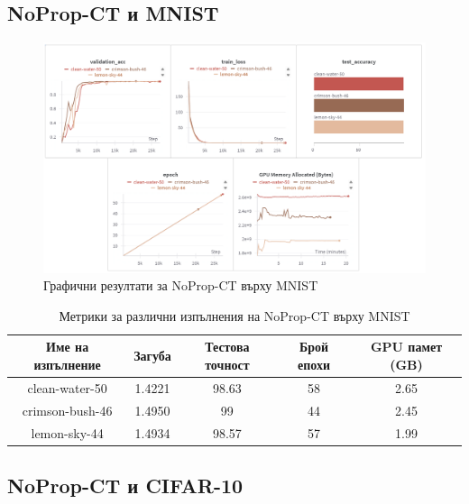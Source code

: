 \documentclass[a4paper,11pt]{article}
\begin{document}
\subsection{NoProp-CT и MNIST}

\begin{figure}[H]
    \centering
    \includegraphics[width=6.26in,keepaspectratio]{images/NoProp-CT MNIST.png}
    \caption{Графични резултати за NoProp-CT върху MNIST}
\end{figure}

\begin{table}[H]
  \centering
  \renewcommand{\arraystretch}{1.5} %
  \begin{tabular}{ccccc}
    \toprule
    \textbf{Име на изпълнение} & \textbf{Загуба} & \textbf{Тестова точност} & \textbf{Брой епохи} & \textbf{GPU памет (GB)}\\
    \midrule
    clean-water-50 & 1.4221 & 98.63 & 58 & 2.65\\
    crimson-bush-46 & 1.4950 & 99 & 44 & 2.45\\
    lemon-sky-44 & 1.4934 & 98.57 & 57 & 1.99\\
    \bottomrule
  \end{tabular}
  \caption{Метрики за различни изпълнения на NoProp-CT върху MNIST}
  \label{tab:avg_metrics_noprop_ct_mnist}
\end{table}


\subsection{NoProp-CT и CIFAR-10}
\end{document}
